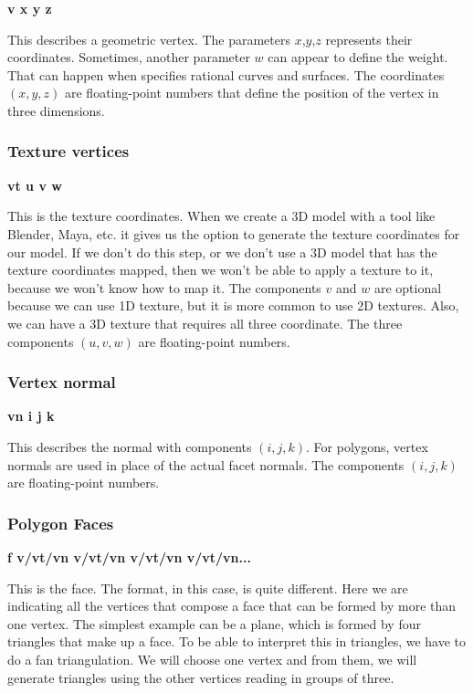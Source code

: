 \documentclass[titlepage,12pt]{report}
\begin{document}
\textbf{v x y z}

This describes a geometric vertex. The parameters $x$,$y$,$z$ represents their coordinates. Sometimes, another parameter $w$ can appear to define the weight. That can happen when specifies rational curves and surfaces. The coordinates $(x,y,z)$ are floating-point numbers that define the position of the vertex in three dimensions.

\subsubsection{Texture vertices}

\textbf{vt u v w}

This is the texture coordinates. When we create a 3D model with a tool like Blender, Maya, etc. it gives us the option to generate the texture coordinates for our model. If we don't do this step, or we don't use a 3D model that has the texture coordinates mapped, then we won't be able to apply a texture to it, because we won't know how to map it. The components $v$ and $w$ are optional because we can use 1D texture, but it is more common to use 2D textures. Also, we can have a 3D texture that requires all three coordinate. The three components $(u, v, w)$ are floating-point numbers.

\subsubsection{Vertex normal}

\textbf{vn i j k}

This describes the normal with components $(i,j,k)$. For polygons, vertex normals are used in place of the actual facet normals. The components $(i,j,k)$ are floating-point numbers.

\subsubsection{Polygon Faces}

\textbf{f v/vt/vn v/vt/vn v/vt/vn v/vt/vn...}

This is the face. The format, in this case, is quite different. Here we are indicating all the vertices that compose a face that can be formed by more than one vertex. The simplest example can be a plane, which is formed by four triangles that make up a face. To be able to interpret this in triangles, we have to do a fan triangulation. We will choose one vertex and from them, we will generate triangles using the other vertices reading in groups of three.
\end{document}
